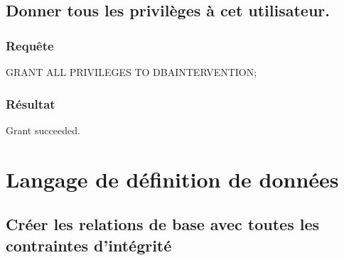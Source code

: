 \documentclass[•]{article}
\begin{document}
\subsection{Donner tous les privilèges à cet utilisateur.}
\subsubsection{Requête}
\begin{sql}
GRANT ALL PRIVILEGES TO DBAINTERVENTION;
\end{sql}
\subsubsection{Résultat}
\begin{sql}
Grant succeeded.
\end{sql}
\section{Langage de définition de données}
\subsection{Créer les relations de base avec toutes les contraintes d’intégrité}
\end{document}

